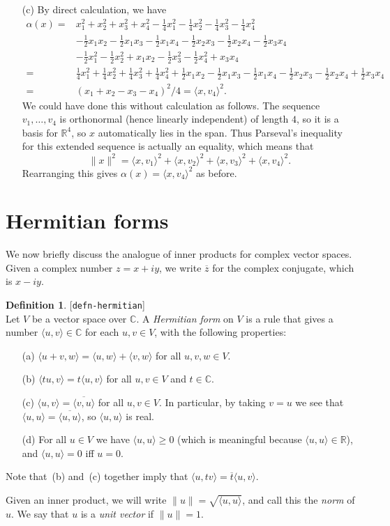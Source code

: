 \documentclass{amsart}
\newcommand{\lbl}[1]{\label{#1}\textup{[\texttt{#1}]}\ \\}
\newcommand{\lbl}{\label}
\newcommand{\R}         {{\mathbb{R}}}
\newcommand{\C}         {{\mathbb{C}}}
\newcommand{\al}        {\alpha}
\newcommand{\half}      {{\textstyle\frac{1}{2}}}
\newcommand{\qrt}       {{\tfrac{1}{4}}}
\newcommand{\ip}[1]     {\langle #1\rangle}
\newcommand{\ov}[1]     {\overline{#1}}
\renewcommand{\:}       {\colon}
\theoremstyle{definition}
\newtheorem{definition}[theorem]{Definition}
\renewenvironment{solution}{\SolutionAtEnd}{\endSolutionAtEnd}
\begin{document}
\begin{solution}
\begin{itemize}
  \item[(c)] By direct calculation, we have 
   \begin{align*}
    \al(x) =& 
     x_1^2+x_2^2+x_3^2+x_4^2 - 
     \qrt x_1^2 - \qrt x_2^2 - \qrt x_3^2 - \qrt x_4^2 \\ &
     - \half x_1x_2 - \half x_1x_3 - \half x_1x_4
     - \half x_2x_3 - \half x_2x_4 - \half x_3x_4 \\ &
     - \half x_1^2 - \half x_2^2 + x_1x_2
     - \half x_3^2 - \half x_4^2 + x_3x_4 \\
     =& \qrt x_1^2 + \qrt x_2^2 + \qrt x_3^2 + \qrt x_4^2
     + \half x_1x_2 - \half x_1x_3 - \half x_1x_4
     - \half x_2x_3 - \half x_2x_4 + \half x_3x_4 \\
     =& (x_1+x_2-x_3-x_4)^2/4 = \ip{x,v_4}^2.
   \end{align*}
   We could have done this without calculation as follows.  The
   sequence $v_1,\dotsc,v_4$ is orthonormal (hence linearly
   independent) of length $4$, so it is a basis for $\R^4$, so $x$ automatically
   lies in the span.  Thus Parseval's inequality for this extended
   sequence is actually an equality, which means that 
   \[ \|x\|^2 =
        \ip{x,v_1}^2 + \ip{x,v_2}^2 + \ip{x,v_3}^2 + \ip{x,v_4}^2.
   \]
   Rearranging this gives $\al(x)=\ip{x,v_4}^2$ as before.
 \end{itemize}
\end{solution}

\section{Hermitian forms}
\label{sec-hermitian}

We now briefly discuss the analogue of inner products for
complex vector spaces.  Given a complex number $z=x+iy$, we
write $\ov{z}$ for the complex conjugate, which is $x-iy$.
\begin{definition}\lbl{defn-hermitian}
 Let $V$ be a vector space over $\C$.  A \emph{Hermitian
  form} on $V$ is a rule that gives a number
 $\ip{u,v}\in\C$ for each $u,v\in V$, with the following
 properties: 
 \begin{itemize}
  \item[(a)] $\ip{u+v,w}=\ip{u,w}+\ip{v,w}$ for all
   $u,v,w\in V$.
  \item[(b)] $\ip{tu,v}=t\ip{u,v}$ for all $u,v\in V$ and
   $t\in\C$.
  \item[(c)] $\ip{u,v}=\ov{\ip{v,u}}$ for all $u,v\in V$.
   In particular, by taking $v=u$ we see that
   $\ip{u,u}=\ov{\ip{u,u}}$, so $\ip{u,u}$ is real.
  \item[(d)] For all $u\in V$ we have $\ip{u,u}\geq 0$
   (which is meaningful because $\ip{u,u}\in\R$), and 
   $\ip{u,u}=0$ iff $u=0$.
 \end{itemize}
 Note that~(b) and~(c) together imply that
 $\ip{u,tv}=\ov{t}\ip{u,v}$. 

 Given an inner product, we will write
 $\|u\|=\sqrt{\ip{u,u}}$, and call this the \emph{norm} of
 $u$.  We say that $u$ is a \emph{unit vector} if
 $\|u\|=1$. 
\end{definition}
\end{document}
